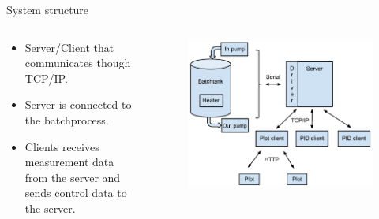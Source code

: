 \documentclass{beamer}
\begin{document}
\begin{frame}{System structure}
\begin{columns}[T]
    \begin{column}{.55\textwidth}
        \begin{itemize}
            \item Server/Client that communicates though TCP/IP.
            \item Server is connected to the batchprocess.
            \item Clients receives measurement data from the server and sends control data to the server.
        \end{itemize}
    \end{column}
    \begin{column}{.45\textwidth}

        \begin{figure}[H]
           \centering
           \includegraphics[width=1.0\textwidth]{systemoverview.pdf}
        \end{figure}

    \end{column}
\end{columns}
\end{frame}
\end{document}
